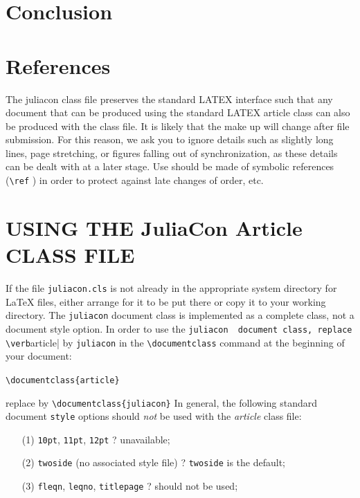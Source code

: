 \documentclass{juliacon}
\begin{document}
\section{Conclusion}
\label{sec:documentclass}


\section{References}
\label{sec:documentclass}
%
The juliacon class file preserves the standard LATEX{} interface such
that any document that can be produced using the standard LATEX{}
article class can also be produced with the class file.\vskip 6pt
It is likely that the make up will change after file submission. For
this reason, we ask you to ignore details such as slightly long lines,
page stretching, or figures falling out of synchronization, as these
details can be dealt with at a later stage.\vskip 6pt
Use should be made of symbolic references (\verb|\ref| ) in order to
protect against late changes of order, etc.

\section{USING THE JuliaCon Article CLASS FILE}

If the file \verb|juliacon.cls|  is not already in the appropriate system directory
for \LaTeX{} files, either arrange for it to be put there or copy
it to your working directory. The \verb|juliacon|  document class is implemented
as a complete class, not a document style option. In order to
use the \verb|juliacon  document class, replace \verb|article|  by \verb|juliacon|  in the
\verb|\documentclass|  command at the beginning of your document:
\vskip 6pt
\begin{centering}
    \verb|\documentclass{article}|  \end{centering}
\vskip 6pt
replace by
\vskip 6pt
 \verb|\documentclass{juliacon}|  \vskip 6pt
In general, the following standard document \verb|style|  options should
{ \itshape not} be used with the {\footnotesize \itshape article} class file:
\begin{enumerate}
\item[(1)] \verb|10pt|,  \verb|11pt|,  \verb|12pt|   ? unavailable;
\item[(2)] \verb|twoside|  (no associated style file) ? \verb|twoside|  is the default;
\item[(3)] \verb|fleqn|, \verb|leqno|, \verb|titlepage| ? should not be used;
\end{enumerate}
\end{document}
